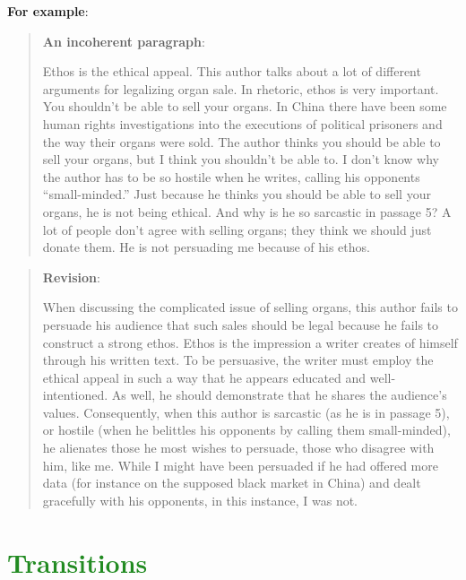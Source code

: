 \documentclass[12pt, hidelinks]{article} %
\begin{document}
 
\textbf{For example}:

\begin{quote}
\textbf{An incoherent paragraph}: 

Ethos is the ethical appeal. This author talks about a lot of different arguments for legalizing organ sale. In rhetoric, ethos is very important. You shouldn't be able to sell your organs. In China there have been some human rights investigations into the executions of political prisoners and the way their organs were sold. The author thinks you should be able to sell your organs, but I think you shouldn't be able to.  I don't know why the author has to be so hostile when he writes, calling his opponents ``small-minded.''  Just because he thinks you should be able to sell your organs, he is not being ethical.  And why is he so sarcastic in passage 5?  A lot of people don't agree with selling organs; they think we should just donate them. He is not persuading me because of his ethos.
\end{quote}

\begin{quote}
\textbf{Revision}:
          
When discussing the complicated issue of  selling organs, this author fails to persuade his audience that such sales should be legal because he fails to construct a strong ethos.  Ethos is the impression a writer creates of himself through his written text. To be persuasive, the writer must employ the ethical appeal in such a way that he appears educated and well-intentioned. As well, he should demonstrate that he shares the audience's values. Consequently, when this author is sarcastic (as he is in passage 5), or hostile (when he belittles his opponents by calling them small-minded),  he alienates those he most wishes to persuade, those who disagree with him, like me. While I might have been persuaded if he had offered more data (for instance on the supposed black market in China) and dealt gracefully with his opponents, in this instance, I was not.

\end{quote}


\section{\textcolor{ForestGreen}{Transitions}}
\end{document}
